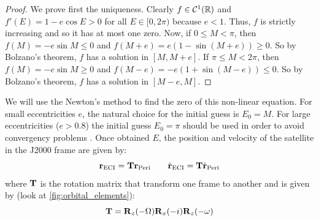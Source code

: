 \documentclass[../main.tex]{subfiles}
\begin{document}
\begin{proof}
  We prove first the uniqueness. Clearly $f\in\mathcal{C}^1(\mathbb{R})$ and $f'(E)=1-e\cos E> 0$ for all $E\in[0,2\pi)$ because $e<1$. Thus, $f$ is strictly increasing and so it has at most one zero. Now, if $0\leq M< \pi$, then $f(M)=-e\sin M\leq 0$ and $f(M+e)=e(1-\sin (M+e))\geq 0$. So by Bolzano's theorem, $f$ has a solution in $[M,M+e]$. If $\pi\leq M< 2\pi$, then $f(M)=-e\sin M\geq 0$ and $f(M-e)=-e(1+\sin (M-e))\leq 0$. So by Bolzano's theorem, $f$ has a solution in $[M-e,M]$.
\end{proof}
We will use the Newton's method to find the zero of this non-linear equation. For small eccentricities $e$, the natural choice for the initial guess is $E_0=M$. For large eccentricities ($e>0.8$) the initial guess $E_0=\pi$ should be used in order to avoid convergency problems \cite{montenbruck}. Once obtained $E$, the position and velocity of the satellite in the J2000 frame are given by:
\begin{equation}
  \boldsymbol{\mathrm{r}}_\mathrm{ECI} = \boldsymbol{\mathrm{T}}\boldsymbol{\mathrm{r}}_\mathrm{Peri} \qquad \dot{\boldsymbol{\mathrm{r}}}_\mathrm{ECI} = \boldsymbol{\mathrm{T}}\dot{\boldsymbol{\mathrm{r}}}_\mathrm{Peri}
\end{equation}
where $\boldsymbol{\mathrm{T}}$ is the rotation matrix that transform one frame to another and is given by (look at \cref{fig:orbital_elements}):
\begin{equation}
  \boldsymbol{\mathrm{T}}=\boldsymbol{\mathrm{R}}_z(-\Omega)\boldsymbol{\mathrm{R}}_x(-i)\boldsymbol{\mathrm{R}}_z(-\omega)
\end{equation}
\end{document}
